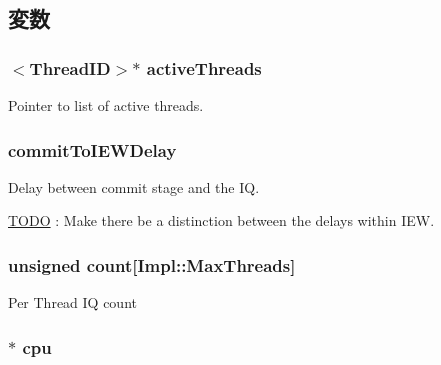\subsection{変数}
\hypertarget{classInstructionQueue_af6eaea53db532812052f71bf0380dab5}{
\subsubsection[{activeThreads}]{$<${\bf ThreadID}$>$$\ast$ {\bf activeThreads}}}
\label{classInstructionQueue_af6eaea53db532812052f71bf0380dab5}
Pointer to list of active threads. \hypertarget{classInstructionQueue_a6b6fe1148ed7c40758e45f351c375552}{
\subsubsection[{commitToIEWDelay}]{ {\bf commitToIEWDelay}}}
\label{classInstructionQueue_a6b6fe1148ed7c40758e45f351c375552}
Delay between commit stage and the IQ. \begin{Desc}
\item[\hyperlink{todo__todo000032}{TODO}]: Make there be a distinction between the delays within IEW. \end{Desc}
\hypertarget{classInstructionQueue_ac638062ba1de6609f143c5ee3a601109}{
\subsubsection[{count}]{\setlength{\rightskip}{0pt plus 5cm}unsigned {\bf count}\mbox{[}Impl::MaxThreads\mbox{]}}}
\label{classInstructionQueue_ac638062ba1de6609f143c5ee3a601109}
Per Thread IQ count \hypertarget{classInstructionQueue_a1379cf882a12ac6fc9eba5da7c84b18b}{
\subsubsection[{cpu}]{$\ast$ {\bf cpu}}}
